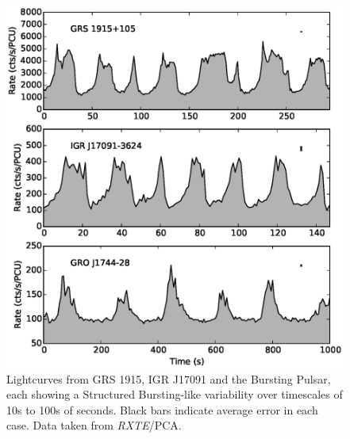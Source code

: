 \begin{figure}
  \centering
  \includegraphics[width=.9\linewidth, trim= 0mm 0mm 0mm 0mm,clip]{images/BPco2.eps}
  \caption[Lightcurves from GRS 1915, IGR J17091 and the Bursting Pulsar, showing lightcurves with Structured Bursting-like behaviour for each.]{Lightcurves from GRS 1915, IGR J17091 and the Bursting Pulsar, each showing a Structured Bursting-like variability over timescales of 10s to 100s of seconds.  Black bars indicate average error in each case.  Data taken from \indexpca\textit{RXTE}/PCA.}
  \label{fig:BP_with_IGR2}
\end{figure}

